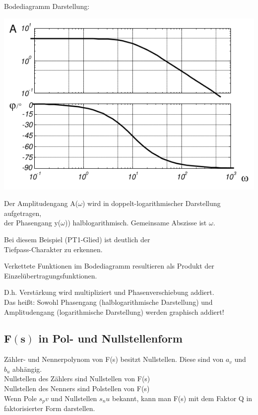 \documentclass[10pt,a4paper]{article}
\begin{document}
\newpage
Bodediagramm Darstellung:
\begin{center}
	\includegraphics[width=0.96\columnwidth]{Figures/Bodediagramm.png}
\end{center}
\begin{mdframed}[style=exercise]
	Der Amplitudengang A($\omega$) wird in doppelt-logarithmischer Darstellung
	aufgetragen,\\ der Phasengang y($\omega$)) halblogarithmisch. Gemeinsame
	Abszisse ist $\omega$.

	Bei diesem Beispiel (PT1-Glied) ist deutlich der\\ Tiefpass-Charakter zu
	erkennen.

	Verkettete Funktionen im Bodediagramm resultieren als Produkt der
	Einzelübertragungsfunktionen.

	D.h. Verstärkung wird multipliziert und Phasenverschiebung addiert.\\ Das
	heißt: Sowohl Phasengang (halblogarithmische Darstellung) und Amplitudengang
	(logarithmische Darstellung) werden graphisch addiert!
\end{mdframed}

\subsection{$\mathbf{F(s)}$ in Pol- und Nullstellenform}
\begin{mdframed}[style=exercise]
	Zähler- und Nennerpolynom von F(s) besitzt Nullstellen. Diese sind von
	$a_v$ und $b_u$ abhängig.\\
	Nullstellen des Zählers sind Nullstellen von F(s)\\
	Nullstellen des Nenners sind Polstellen von F(s)\\
	Wenn Pole $s_pv$ und Nullstellen $s_nu$ bekannt, kann man F(s) mit dem
	Faktor Q in faktorisierter Form darstellen.
\end{mdframed}
\end{document}
